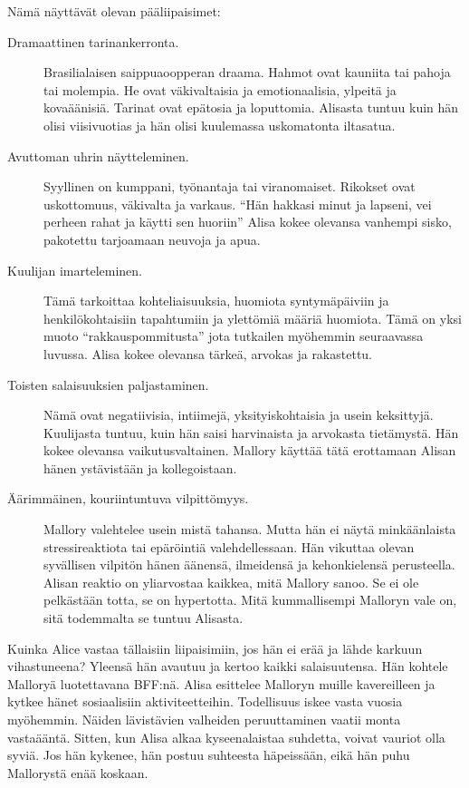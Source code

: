 Nämä näyttävät olevan pääliipaisimet:
\begin{description}
\item[Dramaattinen tarinankerronta.] Brasilialaisen saippuaoopperan draama. Hahmot ovat kauniita tai pahoja tai molempia. He ovat väkivaltaisia ja emotionaalisia, ylpeitä ja kovaäänisiä. Tarinat ovat epätosia ja loputtomia. Alisasta tuntuu kuin hän olisi viisivuotias ja hän olisi kuulemassa uskomatonta iltasatua.
\item[Avuttoman uhrin näytteleminen.] Syyllinen on kumppani, työnantaja tai viranomaiset. Rikokset ovat uskottomuus, väkivalta ja varkaus. ``Hän hakkasi minut ja lapseni, vei perheen rahat ja käytti sen huoriin'' Alisa kokee olevansa vanhempi sisko, pakotettu tarjoamaan neuvoja ja apua.
\item[Kuulijan imarteleminen.] Tämä tarkoittaa kohteliaisuuksia, huomiota syntymäpäiviin ja henkilökohtaisiin tapahtumiin ja ylettömiä määriä huomiota. Tämä on yksi muoto ``rakkauspommitusta\vmq{,}'' jota tutkailen myöhemmin seuraavassa luvussa. Alisa kokee olevansa tärkeä, arvokas ja rakastettu.
\item[Toisten salaisuuksien paljastaminen.] Nämä ovat negatiivisia, intiimejä, yksityiskohtaisia ja usein keksittyjä. Kuulijasta tuntuu, kuin hän saisi harvinaista ja arvokasta tietämystä. Hän kokee olevansa vaikutusvaltainen. Mallory käyttää tätä erottamaan Alisan hänen ystävistään ja kollegoistaan.
\item[Äärimmäinen, kouriintuntuva vilpittömyys.] Mallory valehtelee usein mistä tahansa. Mutta hän ei näytä minkäänlaista stressireaktiota tai epäröintiä valehdellessaan. Hän vikuttaa olevan syvällisen vilpitön hänen äänensä, ilmeidensä ja kehonkielensä perusteella. Alisan reaktio on yliarvostaa kaikkea, mitä Mallory sanoo. Se ei ole pelkästään totta, se on hypertotta. Mitä kummallisempi Malloryn vale on, sitä todemmalta se tuntuu Alisasta.
\end{description}
Kuinka Alice vastaa tällaisiin liipaisimiin, jos hän ei erää ja lähde karkuun vihastuneena? Yleensä hän avautuu ja kertoo kaikki salaisuutensa. Hän kohtele Malloryä luotettavana BFF:nä. Alisa esittelee Malloryn muille kavereilleen ja kytkee hänet sosiaalisiin aktiviteetteihin. Todellisuus iskee vasta vuosia myöhemmin. Näiden lävistävien valheiden peruuttaminen vaatii monta vastaääntä. Sitten, kun Alisa alkaa kyseenalaistaa suhdetta, voivat vauriot olla syviä. Jos hän kykenee, hän postuu suhteesta häpeissään, eikä hän puhu Mallorystä enää koskaan.

